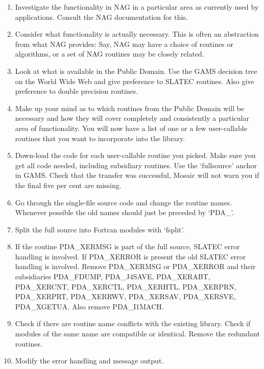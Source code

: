 \documentclass[11pt,twoside]{article}
\newcommand{\htmladdnormallink}[2]{#1}
\newcommand{\htmlref}[2]{#1}
\begin{document}
\sloppy
\begin{enumerate}
\item 
   Investigate the functionality in NAG in a particular area as
   currently used by applications. Consult the NAG documentation for
   this.
\item 
   Consider what functionality is actually necessary. This is often an
   abstraction from what NAG provides: Say, NAG may have a choice of
   routines or algorithms, or a set of NAG routines may be closely
   related.
\item 
   Look at what is available in the Public Domain. Use the
\htmladdnormallink{GAMS decision tree}
{http://gams.nist.gov/cgi-bin/gams-serve}
   on the World Wide Web and give preference to SLATEC routines. Also give
   preference to double precision routines.
\item 
   Make up your mind as to which routines from the Public Domain will be
   necessary and how they will cover completely and consistently a
   particular area of functionality. You will now have a list of one or
   a few user-callable routines that you want to incorporate into the
   library.
\item 
   Down-load the code for each user-callable routine you picked. Make
   sure you get all code needed, including subsidiary routines. Use the
   `fullsource' anchor in GAMS. Check that the transfer was
   successful, Mosaic will not warn you if the final five per cent are
   missing.
\item 
   Go through the single-file source code and change the routine names.
   Whenever possible the old names should just be preceded by `PDA\_'.
\item 
   Split the full source into Fortran modules with `fsplit'.
\item
   If the routine
\htmlref{PDA\_XERMSG}{PDA\_XERMSG}
   is part of the full source, SLATEC error
   handling is involved. If PDA\_XERROR is present the old SLATEC error
   handling is involved. Remove PDA\_XERMSG or PDA\_XERROR and their
   subsidiaries PDA\_FDUMP, PDA\_J4SAVE, PDA\_XERABT, PDA\_XERCNT,
   PDA\_XERCTL, PDA\_XERHTL, PDA\_XERPRN, PDA\_XERPRT, PDA\_XERRWV,
   PDA\_XERSAV, PDA\_XERSVE, PDA\_XGETUA. Also remove PDA\_I1MACH.
\item 
   Check if there are routine name conflicts with the existing library.
   Check if modules of the same name are compatible or identical. Remove
   the redundant routines.
\item 
   Modify the error handling and message output.
   \begin{itemize}

\end{itemize}
\end{enumerate}
\end{document}
